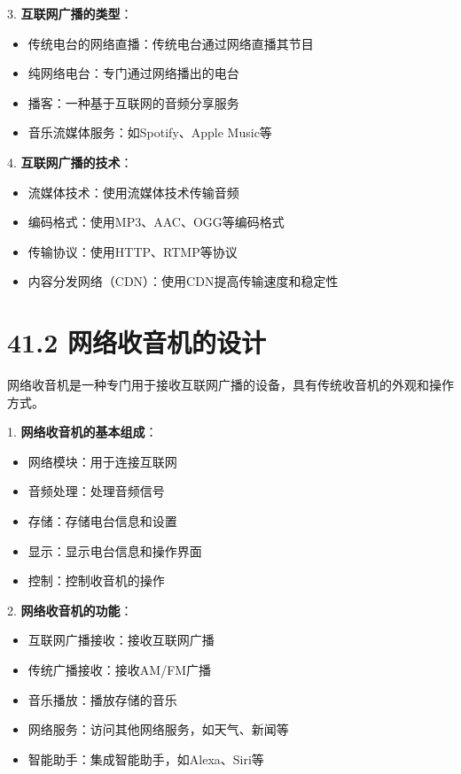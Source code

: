 \documentclass[12pt,UTF8]{ctexbook}
\begin{document}
3. \textbf{互联网广播的类型}：
   \begin{itemize}[leftmargin=3.5em]
   \item 传统电台的网络直播：传统电台通过网络直播其节目
   \item 纯网络电台：专门通过网络播出的电台
   \item 播客：一种基于互联网的音频分享服务
   \item 音乐流媒体服务：如Spotify、Apple Music等
   \end{itemize}

4. \textbf{互联网广播的技术}：
   \begin{itemize}[leftmargin=3.5em]
   \item 流媒体技术：使用流媒体技术传输音频
   \item 编码格式：使用MP3、AAC、OGG等编码格式
   \item 传输协议：使用HTTP、RTMP等协议
   \item 内容分发网络（CDN）：使用CDN提高传输速度和稳定性
   \end{itemize}

\section*{41.2 网络收音机的设计}

网络收音机是一种专门用于接收互联网广播的设备，具有传统收音机的外观和操作方式。

1. \textbf{网络收音机的基本组成}：
   \begin{itemize}[leftmargin=3.5em]
   \item 网络模块：用于连接互联网
   \item 音频处理：处理音频信号
   \item 存储：存储电台信息和设置
   \item 显示：显示电台信息和操作界面
   \item 控制：控制收音机的操作
   \end{itemize}

2. \textbf{网络收音机的功能}：
   \begin{itemize}[leftmargin=3.5em]
   \item 互联网广播接收：接收互联网广播
   \item 传统广播接收：接收AM/FM广播
   \item 音乐播放：播放存储的音乐
   \item 网络服务：访问其他网络服务，如天气、新闻等
   \item 智能助手：集成智能助手，如Alexa、Siri等
   \end{itemize}
\end{document}
